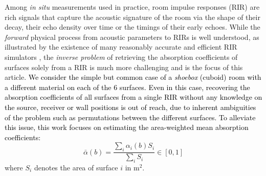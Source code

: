 \documentclass[reprint]{JASA}
\makeatletter
\newif\ifnotes
\newcommand{\note}[1]{\@bsphack\ifnotes{#1}\fi\@esphack}
\makeatother
\begin{document}
Among \textit{in situ} measurements used in practice, room impulse responses (RIR) are rich signals that capture the acoustic signature of the room via the shape of their decay, their echo density over time
or the timings of their early echoes.
While the \textit{forward} physical process from acoustic parameters to RIRs is well understood, as illustrated by the existence of many reasonably accurate and efficient RIR simulators \cite{habets2006room,schimmel2009fast,scheibler2018pyroomacoustics}, the \textit{inverse problem} of retrieving the absorption coefficients of surfaces solely from a RIR is much more challenging and is the focus of this article.
\note{\sout{To obtain the acoustic diagnosis of a room and deduce a renovation plan, one would ideally need to know the absorption coefficients $\alpha_i(b)$ of each individual surface $i$ in the room. However, no method is currently known to reliably estimate these quantities \textit{in situ}. In practice, the \textit{mean absorption coefficients} are estimated instead. These are defined as}}
\textcolor{black}{We consider the simple but common case of a \textit{shoebox} (cuboid) room with a different material on each of the 6 surfaces. Even in this case, recovering the absorption coefficients of all surfaces from a single RIR without any knowledge on the source, receiver or wall positions is out of reach, due to inherent ambiguities of the problem such as permutations between the different surfaces. To alleviate this issue, this work focuses on estimating the area-weighted mean absorption coefficients:}
\begin{equation}
\label{eq:alpha}
\bar{\alpha}(b) = \frac{\sum_i\alpha_i(b)S_i}{\sum_i S_i}\in[0,1]
\end{equation}
where $S_i$ denotes the area of surface $i$ in $\textrm{m}^2$.
\note{\sout{Currently, the standard method to estimate $\bar{\alpha}(b)$ \textit{in situ} is to calculate the room's reverberation time $RT(b)$ by Schroeder integration of a measured room impulse response (RIR) \mbox{\cite{Schroeder:65}} and to use it in the celebrated Sabine's law or its more precise variant from Eyring, based on reverberation theory \mbox{\cite{Kuttruff:09}}: }}
\end{document}
